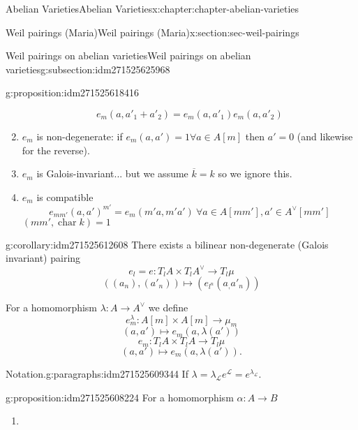 \documentclass[oneside,10pt,]{book}
\numberwithin{equation}{section}
\newcommand{\sheaf}[1]{\operatorname{\mathcal{#1}}}
\newcommand{\lb}{[}
\newcommand{\rb}{]}
\DeclareMathOperator{\characteristic}{char}
\begin{document}
\begin{chapterptx}{Abelian Varieties}{}{Abelian Varieties}{}{}{x:chapter:chapter-abelian-varieties}
\begin{sectionptx}{Weil pairings (Maria)}{}{Weil pairings (Maria)}{}{}{x:section:sec-weil-pairings}
\begin{subsectionptx}{Weil pairings on abelian varieties}{}{Weil pairings on abelian varieties}{}{}{g:subsection:idm271525625968}
\begin{proposition}{}{}{g:proposition:idm271525618416}
\begin{enumerate}
%
\begin{equation*}
e_m(a,a'_1+a'_2) = e_m(a,a'_1)e_m(a,a'_2)
\end{equation*}
%
\item{}\(e_m\) is non-degenerate: if \(e_m(a,a') = 1 \forall a\in A\lb m\rb\) then \(a' = 0\) (and likewise for the reverse).%
\item{}\(e_m\) is Galois-invariant... but we assume \(\overline k =k\) so we ignore this.%
\item{}\(e_m\) is compatible%
\begin{equation*}
e_{mm'} (a,a')^{m'} = e_m(m'a, m'a') \ \forall a \in A[mm'], a'\in A^\vee [mm']
\end{equation*}
\((mm',\characteristic k) = 1\)%
\end{enumerate}
%
\end{proposition}
\begin{corollary}{}{}{g:corollary:idm271525612608}%
There exists a bilinear non-degenerate (Galois invariant) pairing%
\begin{equation*}
e_l = e \colon T_lA \times T_lA^\vee \to T_l\mu
\end{equation*}
%
\begin{equation*}
((a_n), (a'_n)) \mapsto (e_{l^n}(a_,a'_n))
\end{equation*}
%
\end{corollary}
For a homomorphism \(\lambda \colon A \to A^\vee\) we define%
\begin{equation*}
e_m^\lambda \colon A[m]\times A [m] \to \mu_m
\end{equation*}
%
\begin{equation*}
(a,a') \mapsto e_m(a, \lambda(a'))
\end{equation*}
%
\begin{equation*}
e_m \colon T_lA\times T_l A \to T_l \mu
\end{equation*}
%
\begin{equation*}
(a,a') \mapsto e_m(a, \lambda(a'))\text{.}
\end{equation*}
%
\begin{paragraphs}{Notation.}{g:paragraphs:idm271525609344}%
If \(\lambda = \lambda_{\sheaf L} e^{\sheaf L} = e^{\lambda_{\sheaf L}}\).%
\end{paragraphs}%
\begin{proposition}{}{}{g:proposition:idm271525608224}%
For a homomorphism \(\alpha \colon A \to B\)%
\begin{enumerate}
\item{}%
\begin{equation*}

\end{equation*}
\end{enumerate}
\end{proposition}
\end{subsectionptx}
\end{sectionptx}
\end{chapterptx}
\end{document}
